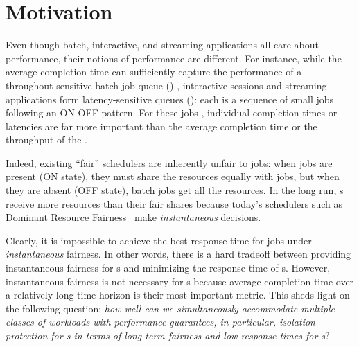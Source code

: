 \section{Motivation}
\label{sec:motivation}

Even though batch, interactive, and streaming applications all care about performance, their notions of performance are different.
For instance, while the average completion time can sufficiently capture the performance of a throughout-sensitive batch-job queue (\batchq) \cite{tetris}, interactive sessions and streaming applications form latency-sensitive queues (\burstq): each \burstq is a sequence of small jobs following an ON-OFF pattern. 
For these jobs \cite{spark-streaming}, individual completion times or latencies are far more important than the average completion time or the throughput of the \burstq.


Indeed, existing ``fair'' schedulers are inherently unfair to \burstq jobs: when \burstq jobs are present (ON state), they must share the resources equally with \batchq jobs, but when they are absent (OFF state), batch jobs get all the resources. 
In the long run, {\batchq}s receive more resources than their fair shares because today's schedulers such as Dominant Resource Fairness~\cite{drf} make \emph{instantaneous} decisions.


Clearly, it is impossible to achieve the best response time for \burstq jobs under \emph{instantaneous} fairness. 
In other words, there is a hard tradeoff between providing instantaneous fairness for {\batchq}s and minimizing the response time of {\burstq}s. 
However, instantaneous fairness is not necessary for {\batchq}s because average-completion time over a relatively long time horizon is their most important metric.
This sheds light on the following question: \emph{how well can we simultaneously accommodate multiple classes of workloads with performance guarantees, in particular, isolation protection for {\batchq}s in terms of long-term fairness and low response times for {\burstq}s}? 



